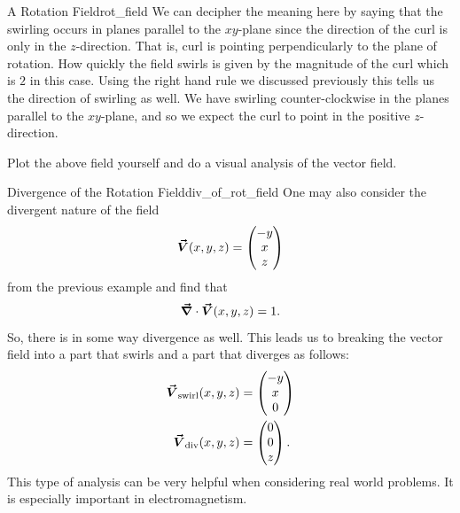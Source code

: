 \begin{ex}{A Rotation Field}{rot_field}
		        We can decipher the meaning here by saying that the swirling occurs in planes parallel to the $xy$-plane since the direction of the curl is only in the $z$-direction.  That is, curl is pointing perpendicularly to the plane of rotation.  How quickly the field swirls is given by the magnitude of the curl which is $2$ in this case.  Using the right hand rule we discussed previously this tells us the direction of swirling as well.  We have swirling counter-clockwise in the planes parallel to the $xy$-plane, and so we expect the curl to point in the positive $z$-direction.

		        \end{ex}

		        \begin{exercise}
		        Plot the above field yourself and do a visual analysis of the vector field.
		        \end{exercise}

		        \begin{ex}{Divergence of the Rotation Field}{div_of_rot_field}
		        One may also consider the divergent nature of the field
		        \[
		        \boldsymbol{\vec{V}}(x,y,z) = \begin{pmatrix} -y \\ x \\ z\end{pmatrix}
		        \]
		        from the previous example and find that
		        \[
		        \boldsymbol{\vec{\nabla}} \cdot \boldsymbol{\vec{V}}(x,y,z) = 1.
		        \]
		        So, there is in some way divergence as well.  This leads us to breaking the vector field into a part that swirls and a part that diverges as follows:
		        \begin{align*}
		            \boldsymbol{\vec{V}}_\textrm{swirl}(x,y,z) &= \begin{pmatrix} -y \\ x \\ 0 \end{pmatrix}\\
		            \boldsymbol{\vec{V}}_\textrm{div}(x,y,z) &= \begin{pmatrix} 0 \\ 0 \\ z \end{pmatrix}.
		        \end{align*}
		        This type of analysis can be very helpful when considering real world problems.  It is especially important in electromagnetism.
		        \end{ex}

